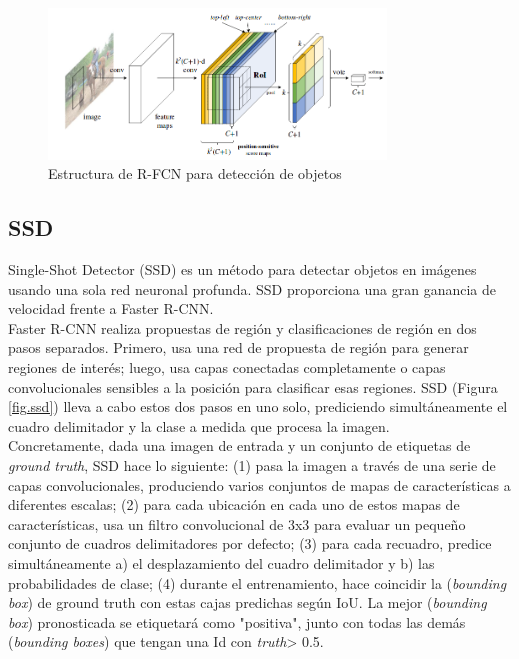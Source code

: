 \documentclass{bmvc2k}
\begin{document}
\begin{figure}
\begin{center}
	\includegraphics[width=0.8\textwidth]{images/rfcn.png}
   \caption{Estructura de R-FCN para detección de objetos}
	\label{fig.rfcn}
\end{center}
\end{figure}


\subsection{SSD}

Single-Shot Detector (SSD) es un método para detectar objetos en imágenes usando una sola
red neuronal profunda. SSD proporciona una gran ganancia de velocidad frente a Faster R-CNN.\\

Faster R-CNN realiza propuestas de región y clasificaciones de región en dos pasos separados. Primero, usa una red de propuesta de región para generar regiones de interés; luego, usa capas conectadas completamente o capas convolucionales sensibles a la posición para clasificar esas regiones. SSD (Figura \ref{fig.ssd}) lleva a cabo estos dos pasos en uno solo, prediciendo simultáneamente el cuadro delimitador y la clase a medida que procesa la imagen.\\

Concretamente, dada una imagen de entrada y un conjunto de etiquetas de \textit{ground truth}, SSD hace lo siguiente: (1) pasa la imagen a través de una serie de capas convolucionales, produciendo varios conjuntos de mapas de características a diferentes escalas; (2) para cada ubicación en cada uno de estos mapas de características, usa un filtro convolucional de 3x3 para evaluar un pequeño conjunto de cuadros delimitadores por defecto; (3) para cada recuadro, predice simultáneamente a) el desplazamiento del cuadro delimitador y b) las probabilidades de clase; (4) durante el entrenamiento, hace coincidir la (\textit{bounding box}) de ground truth con estas cajas predichas según IoU. La mejor (\textit{bounding box}) pronosticada se etiquetará como "positiva", junto con todas las demás (\textit{bounding boxes}) que tengan una Id con \textit{truth}> 0.5.\\
\end{document}

